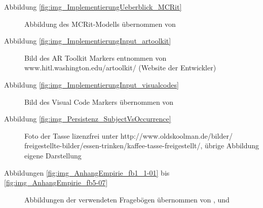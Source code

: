 \begin{description}
 \item[Abbildung \ref{fig:img_ImplementierungUeberblick_MCRit}] Abbildung des MCRit-Modells übernommen von \citep{Ishii08}
 \item[Abbildung \ref{fig:img_ImplementierungInput_artoolkit}] Bild des AR Toolkit Markers entnommen von www.hitl.washington.edu/artoolkit/ (Website der Entwickler)
 \item[Abbildung \ref{fig:img_ImplementierungInput_visualcodes}] Bild des Visual Code Markers übernommen von \citep{Rohs04}
 \item[Abbildung \ref{fig:img_Persistenz_SubjectVsOccurrence}] Foto der Tasse lizenzfrei unter http://www.oldskoolman.de/bilder/\\freigestellte-bilder/essen-trinken/kaffee-tasse-freigestellt/, übrige Abbildung eigene Darstellung
 \item[Abbildungen \ref{fig:img_AnhangEmpirie_fb1_1-01} bis \ref{fig:img_AnhangEmpirie_fb5-07}] Abbildungen der verwendeten Fragebögen übernommen von \citep{Bohninger10}, \citep{Wahlmuller10} und \citep{Bindreiter10}
\end{description}

